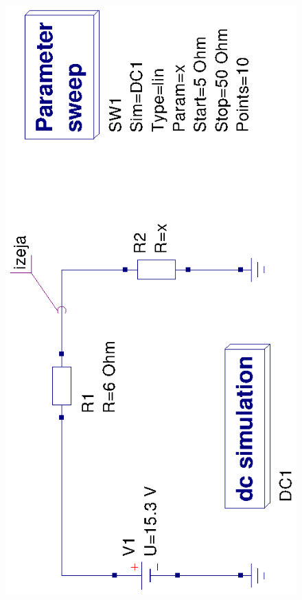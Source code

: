 \documentclass{report}
\begin{document}
\begin{figure}[b!]
\centering
{} {\includegraphics[width=\columnwidth]{1.2shema.ps}}
\label{att:4}
\end{figure}
\end{document}
